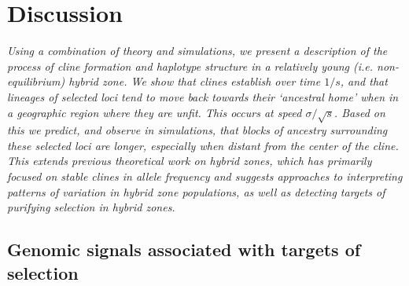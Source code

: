 \documentclass[11pt,letterpaper]{article}
\newcommand{\alisa}[1]{{\em \color{red} #1}}
\newcommand{\plr}[1]{{\em \color{blue} #1}}
\begin{document}
\section*{Discussion}


\alisa{Using a combination of theory and simulations, we present a description of the process of cline formation and haplotype structure in a relatively young (i.e. non-equilibrium) hybrid zone.
We show that clines establish over time $1/s$, and that lineages of selected loci tend to move back towards their `ancestral home' when in a geographic region where they  are unfit. 
This occurs at speed $\sigma/\sqrt{s}$. Based on this we predict, and observe in simulations, that blocks of ancestry surrounding these selected loci are longer, especially when distant from the center of the cline. 
This extends previous theoretical work on hybrid zones, which has primarily focused on stable clines in allele frequency and  suggests approaches to interpreting patterns of variation in hybrid zone populations, as well as detecting targets of purifying selection in hybrid zones.}

\subsection*{Genomic signals associated with targets of selection}
\end{document}
